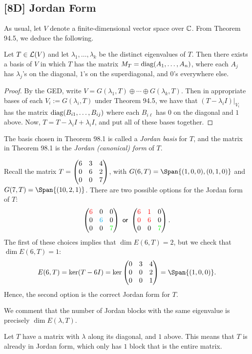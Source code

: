 \documentclass{article}
\newcommand{\red}{\textcolor{red}}
\newcommand{\bl}{\textcolor{cyan}}
\begin{document}
\subsection*{[8D] Jordan Form}
As usual, let $V$ denote a finite-dimensional vector space over $\mathbb C$. From Theorem 94.5, we deduce the following.
\begin{theorem}
Let $T\in\mathcal L(V)$ and let $\lambda_1, \ldots, \lambda_k$ be the distinct eigenvalues of $T$. Then there exists a basis of $V$ in which $T$ has the matrix $M_T =\operatorname{diag}(A_1, \ldots, A_n)$, where each $A_j$ has $\lambda_j$'s on the diagonal, $1$'s on the superdiagonal, and $0$'s everywhere else.
\end{theorem}
\begin{proof}
By the GED, write $V = G(\lambda_1, T) \oplus \cdots \oplus G(\lambda_k, T)$. Then in appropriate bases of each $V_i := G(\lambda_i, T)$ under Theorem 94.5, we have that $(T - \lambda_iI)|_{V_i}$ has the matrix $\operatorname{diag}(B_{i1}, \ldots, B_{ij})$ where each $B_{i\ell}$ has $0$ on the diagonal and $1$ above. Now, $T = T - \lambda_i I + \lambda_i I$, and put all of these bases together.
\end{proof}
\begin{definition}
The basis chosen in Theorem 98.1 is called a \textit{Jordan basis} for $T$, and the matrix in Theorem 98.1 is the \textit{Jordan (canonical) form} of $T$.
\end{definition}
\begin{example}
Recall the matrix $T = \begin{pmatrix}6 & 3 & 4 \\ 0 & 6 & 2 \\ 0 & 0 & 7 \end{pmatrix}$, with $G(6,T) = \Span\{(1,0,0), (0,1,0)\}$ and $G(7, T) = \Span\{(10, 2, 1)\}$. There are two possible options for the Jordan form of $T$:
$$\matnine {\red 6}00 0{\bl 6}0 00{\aq 7} \textsf{ or } \matnine{\red 6}{\red 1}0 {\red 0}{\red 6} 0 00{\aq 7}.$$
\newpage
The first of these choices implies that $\dim E(6, T) = 2$, but we check that $\dim E(6, T) = 1$:
$$E(6, T) = \ker (T-6I) = \ker \matnine 034 002 001 = \Span\{(1,0,0)\}.$$
Hence, the second option is the correct Jordan form for $T$.
\end{example}

We comment that the number of Jordan blocks with the same eigenvalue is precisely $\dim E(\lambda, T)$.

\begin{example}
Let $T$ have a matrix with $\lambda$ along its diagonal, and $1$ above. This means that $T$ is already in Jordan form, which only has $1$ block that is the entire matrix.
\end{example}
\end{document}
